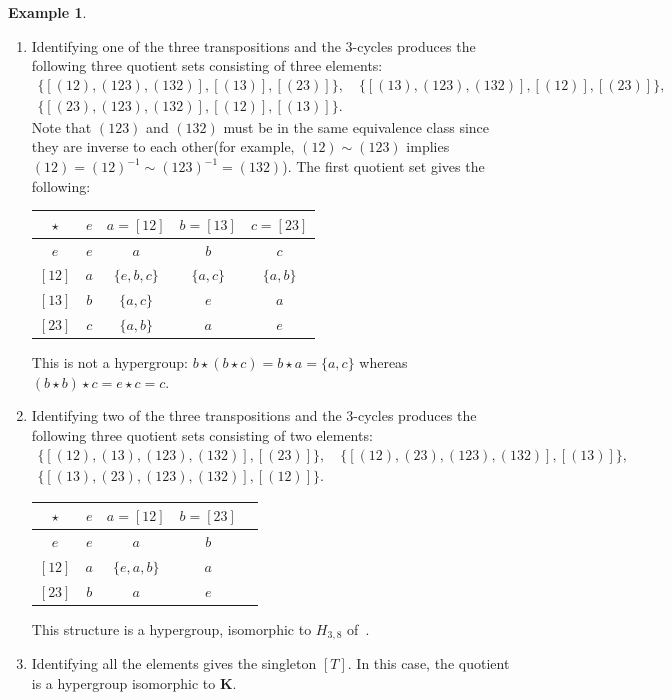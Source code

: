 \documentclass[reqno]{amsart}
\newcommand{\K}{\mathbf{K}}
\numberwithin{equation}{section}
\theoremstyle{plain}
\theoremstyle{definition}
\newtheorem{example}[equation]{Example}
\begin{document}
\begin{example}
\begin{enumerate}
\item Identifying one of the three transpositions and the 3-cycles produces the following three quotient sets consisting of three elements:
\begin{gather*}
\{[(12), (123), (132)], [(13)], [(23)]\},
    \quad \{[(13), (123), (132)], [(12)], [(23)]\}, \\
    \{[(23), (123), (132)], [(12)], [(13)]\}.
\end{gather*}
Note that $(123)$ and $(132)$ must be in the same equivalence class since they are inverse to each other(for example, $(12)\sim (123)$ implies $(12)=(12)^{-1}\sim (123)^{-1}=(132)$). The first quotient set gives the following:
\begin{center}
\begin{tabular}{ |c|c|c|c|c| } 
\hline
$\star$ & $e$ & $a=[12]$ & $b=[13]$ & $c=[23]$ \\
\hline
$e$ & $e$ & $a$ & $b$ & $c$ \\ 
\hline
$[12]$ & $a$ & $\{e, b, c\}$ & $\{a, c\}$
& $\{a, b\}$\\ 
\hline
$[13]$ & $b$ & $\{a, c\}$ & $e$
& $a$\\ 
\hline
$[23]$ & $c$ & $\{a, b\}$ & $a$
& $e$\\ 
\hline
\end{tabular}
\end{center} 
This is not a hypergroup: $b\star (b\star c)=b\star a=\{a, c\}$ whereas $(b\star b)\star c=e\star c=c$.

\item Identifying two of the three transpositions and the 3-cycles produces the following three quotient sets consisting of two elements:
\begin{gather*}
\{[(12), (13), (123), (132)], [(23)]\},
    \quad \{[(12), (23), (123), (132)], [(13)]\}, \\
    \{[(13), (23), (123), (132)], [(12)]\}.
\end{gather*}
\begin{center}
\begin{tabular}{ |c|c|c|c|c| } 
\hline
$\star$ & $e$ & $a=[12]$ & $b=[23]$ \\
\hline
$e$ & $e$ & $a$ & $b$\\ 
\hline
$[12]$ & $a$ & $\{e, a, b\}$ & $a$
\\ 
\hline
$[23]$ & $b$ & $a$ & $e$
\\ 
\hline
\end{tabular}
\end{center}  
This structure is a hypergroup, isomorphic to $H_{3,8}$ of~\cite[\S 7.1]{Zieschang}.
\item Identifying all the elements gives the singleton ${[T]}$. In this case, the quotient is a hypergroup isomorphic to $\K$.
\end{enumerate}
\end{example}
\end{document}
